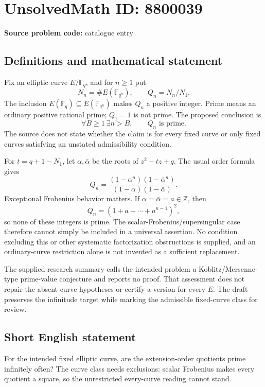 \documentclass[11pt]{article}
\newcommand{\Z}{\mathbb{Z}}
\newcommand{\F}{\mathbb{F}}
\begin{document}
\section*{UnsolvedMath ID: 8800039}
\textbf{Source problem code:} catalogue entry
\subsection{Definitions and mathematical statement}
Fix an elliptic curve \(E/\F_q\), and for \(n\ge1\) put
\[
N_n=\#E(\F_{q^n}),\qquad Q_n=N_n/N_1.
\]
The inclusion \(E(\F_q)\subseteq E(\F_{q^n})\) makes \(Q_n\) a positive integer. Prime means an ordinary positive rational prime; \(Q_1=1\) is not prime. The proposed conclusion is
\[
\forall B\ge1\ \exists n>B,\qquad Q_n\text{ is prime}.
\]
The source does not state whether the claim is for every fixed curve or only fixed curves satisfying an unstated admissibility condition.

For \(t=q+1-N_1\), let \(\alpha,\bar\alpha\) be the roots of \(z^2-tz+q\). The usual order formula gives
\[
Q_n=\frac{(1-\alpha^n)(1-\bar\alpha^n)}{(1-\alpha)(1-\bar\alpha)}.
\]
Exceptional Frobenius behavior matters. If \(\alpha=\bar\alpha=a\in\Z\), then
\[
Q_n=(1+a+\cdots+a^{n-1})^2,
\]
so none of these integers is prime. The scalar-Frobenius/supersingular case therefore cannot simply be included in a universal assertion. No condition excluding this or other systematic factorization obstructions is supplied, and an ordinary-curve restriction alone is not invented as a sufficient replacement.

The supplied research summary calls the intended problem a Koblitz/Mersenne-type prime-value conjecture and reports no proof. That assessment does not repair the absent curve hypotheses or certify a version for every \(E\). The draft preserves the infinitude target while marking the admissible fixed-curve class for review.
\subsection{Short English statement}
For the intended fixed elliptic curve, are the extension-order quotients prime infinitely often? The curve class needs exclusions: scalar Frobenius makes every quotient a square, so the unrestricted every-curve reading cannot stand.
\end{document}
